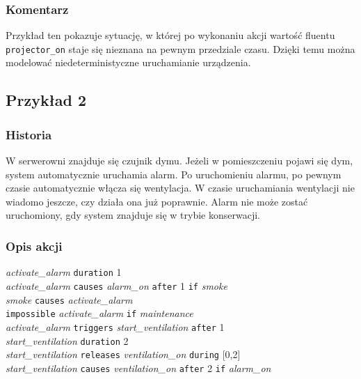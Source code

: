 \documentclass[12pt,a4paper]{article}
\newcommand{\langkw}[1]{\texttt{#1}}
\newcommand{\langvar}[1]{\textit{#1}}
\newenvironment{actiondesc}
{\par\begingroup\small\setlength{\parindent}{0pt}\setlength{\parskip}{0pt}\noindent}
{\par\endgroup}
\begin{document}
\subsubsection*{Komentarz}

Przykład ten pokazuje sytuację, w której po wykonaniu akcji wartość fluentu \texttt{projector\_on} staje się nieznana na pewnym przedziale czasu. Dzięki temu można modelować niedeterministyczne uruchamianie urządzenia.

\subsection{Przykład 2}

\subsubsection*{Historia}

W serwerowni znajduje się czujnik dymu. Jeżeli w pomieszczeniu pojawi się dym, system automatycznie uruchamia alarm. Po uruchomieniu alarmu, po pewnym czasie automatycznie włącza się wentylacja. W czasie uruchamiania wentylacji nie wiadomo jeszcze, czy działa ona już poprawnie. Alarm nie może zostać uruchomiony, gdy system znajduje się w trybie konserwacji.

\subsubsection*{Opis akcji}

\begin{actiondesc}
\langvar{activate\_alarm} \langkw{duration} 1\\
\langvar{activate\_alarm} \langkw{causes} \langvar{alarm\_on} \langkw{after} 1 \langkw{if} \langvar{smoke}\\
\langvar{smoke} \langkw{causes} \langvar{activate\_alarm}\\
\langkw{impossible} \langvar{activate\_alarm} \langkw{if} \langvar{maintenance}\\
\langvar{activate\_alarm} \langkw{triggers} \langvar{start\_ventilation} \langkw{after} 1\\
\langvar{start\_ventilation} \langkw{duration} 2\\
\langvar{start\_ventilation} \langkw{releases} \langvar{ventilation\_on} \langkw{during} [0,2]\\
\langvar{start\_ventilation} \langkw{causes} \langvar{ventilation\_on} \langkw{after} 2 \langkw{if} \langvar{alarm\_on}
\end{actiondesc}
\end{document}
